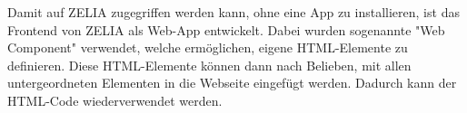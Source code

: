 \label{sec:webcomponents}

Damit auf ZELIA zugegriffen werden kann, ohne eine App zu installieren, ist das Frontend von ZELIA als Web-App entwickelt. Dabei wurden sogenannte "Web Component" verwendet, welche ermöglichen, %
eigene HTML-Elemente zu definieren. Diese HTML-Elemente können dann nach Belieben, mit allen untergeordneten Elementen in die Webseite eingefügt werden. Dadurch kann der HTML-Code wiederverwendet werden.


\pagebreak
